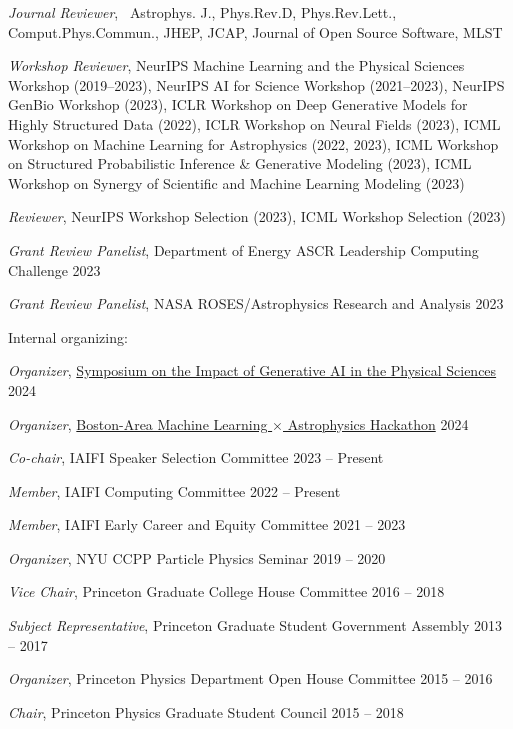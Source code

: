 \documentclass[letterpaper,11pt]{article}
\newenvironment{packed_itemize}{
\begin{itemize}[label=\raisebox{0.25ex}{\tiny$\bullet$}]
  \setlength{\itemsep}{4.2pt}
  \setlength{\parskip}{0pt}
  \setlength{\parsep}{0pt}}{\end{itemize}
}
\begin{document}
  \begin{packed_itemize}
  \item \emph{Journal Reviewer}, \ \scriptsize{Astrophys. J., Phys.Rev.{D}, Phys.Rev.Lett., Comput.Phys.Commun., JHEP,  JCAP, Journal of Open Source Software, MLST}\normalsize
  \item \emph{Workshop Reviewer},  \scriptsize{NeurIPS Machine Learning and the Physical Sciences Workshop (2019--2023), NeurIPS AI for Science Workshop (2021--2023), NeurIPS GenBio Workshop (2023), ICLR Workshop on Deep Generative Models for Highly Structured Data (2022), ICLR Workshop on Neural Fields (2023), ICML Workshop on Machine Learning for Astrophysics (2022, 2023), ICML Workshop on Structured Probabilistic Inference \& Generative Modeling (2023), ICML Workshop on Synergy of Scientific and Machine Learning Modeling (2023)}\normalsize
  \item \emph{Reviewer}, \scriptsize{NeurIPS Workshop Selection (2023), ICML Workshop Selection (2023)}\normalsize
  \item \emph{Grant Review Panelist}, Department of Energy ASCR Leadership Computing Challenge \hfill 2023
  \item \emph{Grant Review Panelist}, NASA ROSES/Astrophysics Research and Analysis \hfill 2023
  \end{packed_itemize}
  \noindent
Internal organizing:
  \begin{packed_itemize}
  \item \emph{Organizer}, \href{https://iaifi.org/generative-ai-workshop}{Symposium on the Impact of Generative AI in the Physical Sciences}  \hfill 2024
  \item \emph{Organizer}, \href{https://iaifi.org/hackathon.html}{Boston-Area Machine Learning $\times$ Astrophysics Hackathon}  \hfill 2024
  \item \emph{Co-chair}, IAIFI Speaker Selection Committee  \hfill 2023 -- Present
  \item \emph{Member}, IAIFI Computing Committee  \hfill 2022 -- Present
  \item \emph{Member}, IAIFI Early Career and Equity Committee  \hfill 2021 -- 2023
  \item \emph{Organizer}, NYU CCPP Particle Physics Seminar \hfill 2019 -- 2020
  \item \emph{Vice Chair}, Princeton Graduate College House Committee \hfill 2016 -- 2018
  \item \emph{Subject Representative}, Princeton Graduate Student Government Assembly \hfill 2013 -- 2017
  \item \emph{Organizer}, Princeton Physics Department Open House Committee  \hfill 2015 -- 2016
  \item \emph{Chair}, Princeton Physics Graduate Student Council \hfill 2015 -- 2018
\end{packed_itemize}
\vspace{2.0mm}
\end{document}
